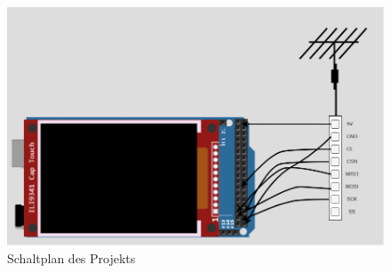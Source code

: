 \documentclass[a4paper, 11pt]{scrartcl}
\begin{document}
\begin{small}
\begin{figure}[H]
    \begin{center}
        \includegraphics[scale=0.4]{Bilder/schaltplan.png}
        \caption{Schaltplan des Projekts}\label{diag:schaltplan}
    \end{center}
\end{figure}



\end{small}
\end{document}
